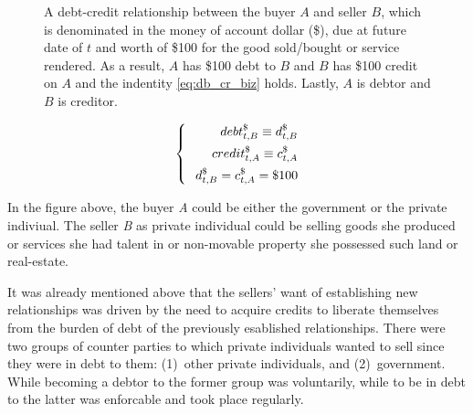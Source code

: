 \begin{figure}[!ht]
\centering
\vspace{.4in}
\captionsetup{width=.9\linewidth,labelfont=bf}
\usetikzlibrary {matrix}
\caption[A debt-credit relationship between buyer and seller]%
{A debt-credit relationship between the buyer $A$ and seller $B$, which is denominated in the money of account dollar (\$), due at future date of $t$ and worth of \$100 for the good  sold/bought or service rendered. As a result, $A$ has \$100 debt to $B$ and $B$ has \$100 credit on $A$ and the indentity \ref{eq:db_cr_biz} holds. Lastly, $A$ is debtor and $B$ is creditor.}
\label{fig:debt_credit_rel1}
\end{figure}

\begin{equation}\label{eq:db_cr_biz}
\left\{
\begin{alignedat}{1}
debt^{\$}_{t,B} \equiv d^{\$}_{t,B} \\
credit^{\$}_{t,A} \equiv c^{\$}_{t,A} \\
\hspace{.1in} d^{\$}_{t,B}=c^{\$}_{t,A}=\$100 \\
\end{alignedat}
\right.
\vspace{.2in}
\end{equation}

In the figure above, the buyer \textit{A} could be either the government or the private indiviual. The seller \textit{B} as private individual could be selling goods she produced or services she had talent in or non-movable property she possessed such land or real-estate. 

It was already mentioned above that the sellers' want of establishing new relationships was driven by the need to acquire credits to liberate themselves from the burden of debt of the previously esablished relationships. There were two groups of counter parties to which private individuals wanted to sell since they were in debt to them: (1)~other private individuals, and (2)~government. While becoming a debtor to the former group was voluntarily, while to be in debt to the latter was enforcable and took place regularly. 

